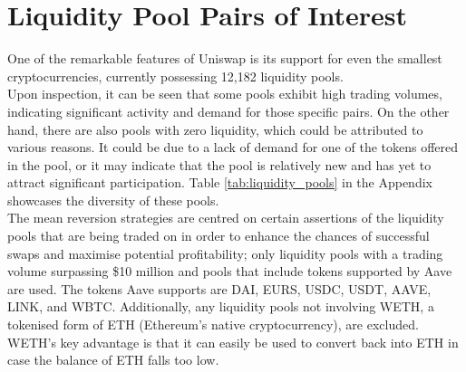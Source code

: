 \section{Liquidity Pool Pairs of Interest}
\label{sec:liquidity-pools}
One of the remarkable features of Uniswap is its support for even the smallest cryptocurrencies, currently possessing 12,182 liquidity pools.
\\[3mm]
Upon inspection, it can be seen that some pools exhibit high trading volumes, indicating significant activity and demand for those specific pairs. On the other hand, there are also pools with zero liquidity, which could be attributed to various reasons. It could be due to a lack of demand for one of the tokens offered in the pool, or it may indicate that the pool is relatively new and has yet to attract significant participation. Table \ref{tab:liquidity_pools} in the Appendix showcases the diversity of these pools.
\\[3mm]
The mean reversion strategies are centred on certain assertions of the liquidity pools that are being traded on in order to enhance the chances of successful swaps and maximise potential profitability; only liquidity pools with a trading volume surpassing \$10 million and pools that include tokens supported by Aave are used. The tokens Aave supports are DAI, EURS, USDC, USDT, AAVE, LINK, and WBTC. Additionally, any liquidity pools not involving WETH, a tokenised form of ETH (Ethereum's native cryptocurrency), are excluded. WETH's key advantage is that it can easily be used to convert back into ETH in case the balance of ETH falls too low.

